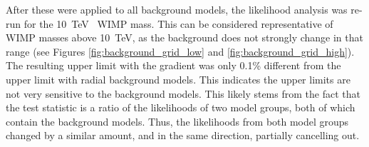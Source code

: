 After these were applied to all background models, the likelihood analysis was re-run for the \SI{10}{\TeV{}} WIMP mass.
This can be considered representative of WIMP masses above \SI{10}{\TeV}, as the background does not strongly change in that range (see Figures \ref{fig:background_grid_low} and \ref{fig:background_grid_high}).
The resulting upper limit with the gradient was only 0.1\% different from the upper limit with radial background models.
This indicates the upper limits are not very sensitive to the background models.
%
%
This likely stems from the fact that the test statistic is a ratio of the likelihoods of two model groups, both of which contain the background models.
Thus, the likelihoods from both model groups changed by a similar amount, and in the same direction, partially cancelling out.



